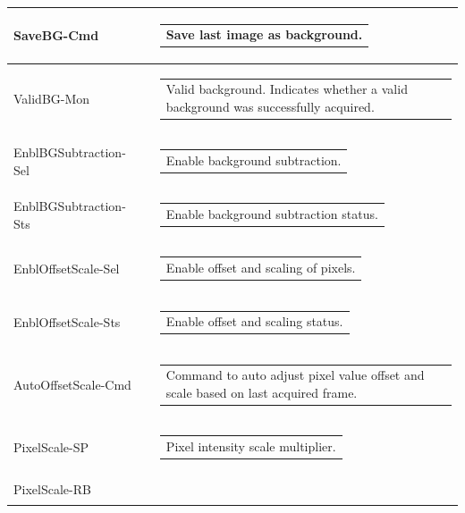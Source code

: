 \documentclass[openany]{article}
\begin{document}
\begin{longtable}{| m{3.0cm} m{4.5cm} m{7.0cm} |}
        SaveBG-Cmd &  & \begin{tabular}{@{}m{6cm}@{}}
                Save last image as background.
            \end{tabular} \hypertarget{}{}\\ \hline
        ValidBG-Mon &  & \begin{tabular}{@{}m{6cm}@{}}
                Valid background. Indicates whether a valid background was successfully
                acquired.
            \end{tabular} \hypertarget{}{}\\ \hline
        EnblBGSubtraction-Sel &  & \begin{tabular}{@{}m{6cm}@{}}
                Enable background subtraction.
            \end{tabular} \\ \hline
        EnblBGSubtraction-Sts &  & \begin{tabular}{@{}m{6cm}@{}}
                Enable background subtraction status.
            \end{tabular} \hypertarget{}{}\\ \hline
        EnblOffsetScale-Sel &  & \begin{tabular}{@{}m{6cm}@{}}
                Enable offset and scaling of pixels.
            \end{tabular} \\ \hline
        EnblOffsetScale-Sts &  & \begin{tabular}{@{}m{6cm}@{}}
                Enable offset and scaling status.
            \end{tabular} \hypertarget{pv:}{}\\ \hline
        AutoOffsetScale-Cmd &  & \begin{tabular}{@{}m{6cm}@{}}
                Command to auto adjust pixel value offset and scale based on last
                acquired frame.
            \end{tabular} \hypertarget{}{}\\ \hline
        PixelScale-SP &  & \begin{tabular}{@{}m{6cm}@{}}
                Pixel intensity scale multiplier.
            \end{tabular} \\ \hline
        PixelScale-RB &  & \begin{tabular}{@{}m{6cm}@{}}

\end{tabular}
\end{longtable}
\end{document}
